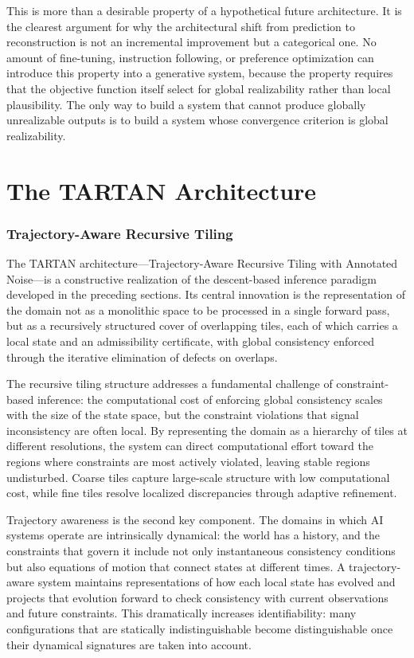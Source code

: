 \documentclass[11pt, oneside]{article}
\begin{document}
This is more than a desirable property of a hypothetical future architecture. It is the clearest argument for why the architectural shift from prediction to reconstruction is not an incremental improvement but a categorical one. No amount of fine-tuning, instruction following, or preference optimization can introduce this property into a generative system, because the property requires that the objective function itself select for global realizability rather than local plausibility. The only way to build a system that cannot produce globally unrealizable outputs is to build a system whose convergence criterion is global realizability.

\part{The TARTAN Architecture}

\section{Trajectory-Aware Recursive Tiling}

The TARTAN architecture---Trajectory-Aware Recursive Tiling with Annotated Noise---is a constructive realization of the descent-based inference paradigm developed in the preceding sections. Its central innovation is the representation of the domain not as a monolithic space to be processed in a single forward pass, but as a recursively structured cover of overlapping tiles, each of which carries a local state and an admissibility certificate, with global consistency enforced through the iterative elimination of defects on overlaps.

The recursive tiling structure addresses a fundamental challenge of constraint-based inference: the computational cost of enforcing global consistency scales with the size of the state space, but the constraint violations that signal inconsistency are often local. By representing the domain as a hierarchy of tiles at different resolutions, the system can direct computational effort toward the regions where constraints are most actively violated, leaving stable regions undisturbed. Coarse tiles capture large-scale structure with low computational cost, while fine tiles resolve localized discrepancies through adaptive refinement.

Trajectory awareness is the second key component. The domains in which AI systems operate are intrinsically dynamical: the world has a history, and the constraints that govern it include not only instantaneous consistency conditions but also equations of motion that connect states at different times. A trajectory-aware system maintains representations of how each local state has evolved and projects that evolution forward to check consistency with current observations and future constraints. This dramatically increases identifiability: many configurations that are statically indistinguishable become distinguishable once their dynamical signatures are taken into account.
\end{document}
